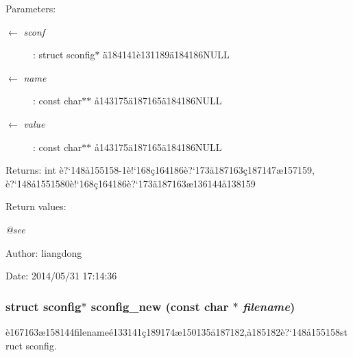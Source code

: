 \begin{Desc}
\item[Parameters:]
\begin{description}
\item[\mbox{$\leftarrow$} {\em sconf}]: struct sconfig$\ast$ \"{a}184141\`{e}131189\"{a}184186NULL \item[\mbox{$\leftarrow$} {\em name}]: const char$\ast$$\ast$ \aa{}143175\"{a}187165\"{a}184186NULL \item[\mbox{$\leftarrow$} {\em value}]: const char$\ast$$\ast$ \aa{}143175\"{a}187165\"{a}184186NULL \end{description}
\end{Desc}
\begin{Desc}
\item[Returns:]int \`{e}?`148\aa{}155158-1\`{e}!`168\c{c}164186\`{e}?`173\"{a}187163\c{c}187147\ae{}157159, \`{e}?`148\aa{}1551580\`{e}!`168\c{c}164186\`{e}?`173\"{a}187163\ae{}136144\aa{}138159 \end{Desc}
\begin{Desc}
\item[Return values:]
\begin{description}
\item[{\em @see}]\end{description}
\end{Desc}
\begin{Desc}
\item[Author:]liangdong \end{Desc}
\begin{Desc}
\item[Date:]2014/05/31 17:14:36 \end{Desc}
\subsubsection{\setlength{\rightskip}{0pt plus 5cm}struct sconfig$\ast$ sconfig\_\-new (const char $\ast$ {\em filename})}\label{sconfig_8h_a0}


\`{e}167163\ae{}158144filename\'{e}133141\c{c}189174\ae{}150135\"{a}187182,\aa{}185182\`{e}?`148\aa{}155158struct sconfig. 

